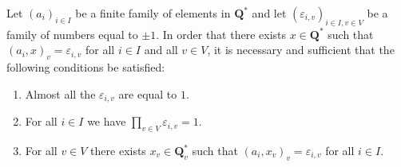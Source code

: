 Let $(a_i)_{i \in I}$ be a finite family of elements in $\mathbf{Q}^*$ and let $(\varepsilon_{i,v})_{i \in I, v \in V}$ be a family of numbers equal to $\pm 1$. In order that there exists $x \in \mathbf{Q}^*$ such that $(a_i, x)_v = \varepsilon_{i,v}$ for all $i \in I$ and all $v \in V$, it is necessary and sufficient that the following conditions be satisfied:

\begin{enumerate}
\item[(1)] Almost all the $\varepsilon_{i,v}$ are equal to $1$.
\item[(2)] For all $i \in I$ we have $\prod_{v \in V} \varepsilon_{i,v} = 1$.
\item[(3)] For all $v \in V$ there exists $x_v \in \mathbf{Q}^*_v$ such that $(a_i, x_v)_v = \varepsilon_{i,v}$ for all $i \in I$.
\end{enumerate}
